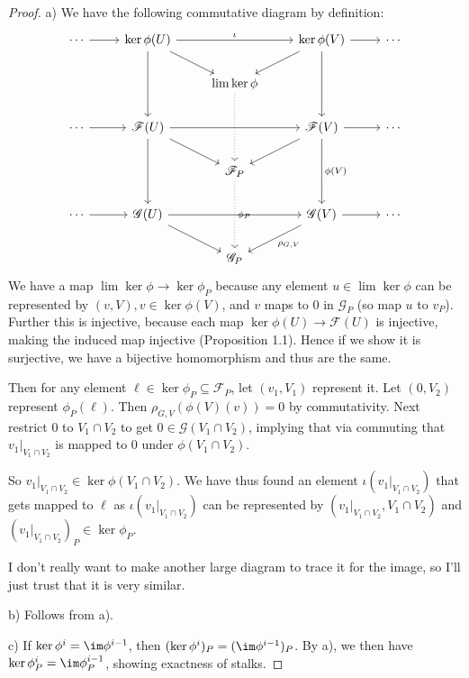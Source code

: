 \begin{proof}
	a)
	We have the following commutative diagram by definition:
	\[
		\begin{tikzcd}
			\cdots & \ker \phi(U) & & \ker \phi(V) & \cdots\\
			       & &\lim \ker \phi & &\\
			\cdots & \mathscr{F}(U) & & \mathscr{F}(V) & \cdots\\
			       & &\mathscr{F}_P & &\\
			\cdots & \mathscr{G}(U) & & \mathscr{G}(V) & \cdots\\
			       & &\mathscr{G}_P & &
			\arrow[from=1-1,to=1-2]
			\arrow["\iota ",from=1-2,to=1-4]
			\arrow[from=1-4,to=1-5]
			\arrow[from=3-1,to=3-2]
			\arrow[from=3-2,to=3-4]
			\arrow[from=3-4,to=3-5]
			\arrow[from=5-1,to=5-2]
			\arrow[from=5-2,to=5-4]
			\arrow[from=5-4,to=5-5]
			\arrow[from=1-2,to=2-3]
			\arrow[from=1-2,to=3-2]
			\arrow[from=3-2,to=5-2]
			\arrow[from=1-4,to=3-4]
			\arrow["\phi (V)",from=3-4,to=5-4]
			\arrow[from=1-4,to=2-3]
			\arrow[from=3-2,to=4-3]
			\arrow[from=3-4,to=4-3]
			\arrow[from=5-2,to=6-3]
			\arrow["\rho_{G,V}",from=5-4,to=6-3]
			\arrow[dotted,from=2-3,to=4-3]
			\arrow["\phi_P",dotted,from=4-3,to=6-3]
		\end{tikzcd}
	\]
	We have a map $\lim\ker \phi \to \ker \phi_P $ because any element $u \in \lim \ker \phi $ can be represented by $(v,V), v\in \ker \phi(V)$, and $v $ maps to 0 in $\mathscr{G}_P $ (so map $u $ to $v_P $).
	Further this is injective, because each map $\ker \phi(U) \to \mathscr{F}(U) $ is injective, making the induced map injective (Proposition 1.1).
	Hence if we show it is surjective, we have a bijective homomorphism and thus are the same.

	Then for any element $\ell \in \ker \phi_P \subseteq \mathscr{F}_P $, let $(v_{1},V_{1}) $ represent it.
	Let $(0,V_{2}) $ represent $\phi _P(\ell) $.
	Then $\rho_{G,V}(\phi(V)(v)) = 0 $ by commutativity.
	Next restrict $0 $ to $V_{1}\cap V_{2} $ to get $0\in \mathscr{G}(V_{1}\cap V_{2}) $, implying that via commuting that $v_{1}|_{V_{1}\cap V_{2}} $ is mapped to 0 under $\phi(V_{1}\cap V_{2})$.

	So $v_{1}|_{V_{1}\cap V_{2}}\in \ker \phi(V_{1}\cap V_{2}) $.
	We have thus found an element $\iota(v_{1}|_{V_{1}\cap V_{2}}) $ that gets mapped to $\ell $ as $\iota(v_{1}|_{V_{1}\cap V_{2}}) $ can be represented by $(v_{1}|_{V_{1}\cap V_{2}},V_{1}\cap V_{2}) $ and $(v_{1}|_{V_{1}\cap V_{2}})_P \in \ker \phi_P$.

	I don't really want to make another large diagram to trace it for the image, so I'll just trust that it is very similar.

	b)
	Follows from a).

	c) If $\ker \phi^{i} = \im \phi^{i-1}$, then $(\ker \phi^i)_P = (\im \phi^{i-1})_P $.
	By a), we then have $\ker \phi^{i}_P = \im \phi^{i-1}_P $, showing exactness of stalks.
\end{proof}

